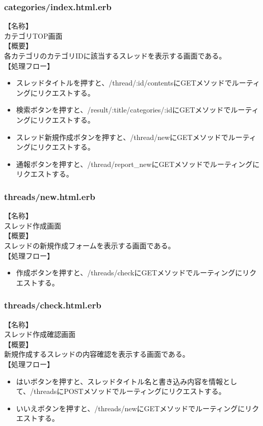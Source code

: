 \documentclass[a4j]{jarticle}
\begin{document}
\subsubsection{categories/index.html.erb}
\noindent
【名称】\\
カテゴリTOP画面\\
【概要】\\
各カテゴリのカテゴリIDに該当するスレッドを表示する画面である。\\
【処理フロー】
\begin{itemize}
  \item スレッドタイトルを押すと、/thread/:id/contentsにGETメソッドでルーティングにリクエストする。
  \item 検索ボタンを押すと、/result/:title/categories/:idにGETメソッドでルーティングにリクエストする。
  \item スレッド新規作成ボタンを押すと、/thread/newにGETメソッドでルーティングにリクエストする。
  \item 通報ボタンを押すと、/thread/report\_newにGETメソッドでルーティングにリクエストする。
\end{itemize}

\subsubsection{threads/new.html.erb}
\noindent
【名称】\\
スレッド作成画面\\
【概要】\\
スレッドの新規作成フォームを表示する画面である。\\
【処理フロー】
\begin{itemize}
  \item 作成ボタンを押すと、/threads/checkにGETメソッドでルーティングにリクエストする。
\end{itemize}

\subsubsection{threads/check.html.erb}
\noindent
【名称】\\
スレッド作成確認画面\\
【概要】\\
新規作成するスレッドの内容確認を表示する画面である。\\
【処理フロー】
\begin{itemize}
  \item はいボタンを押すと、スレッドタイトル名と書き込み内容を情報として、/threadsにPOSTメソッドでルーティングにリクエストする。
  \item いいえボタンを押すと、/threads/newにGETメソッドでルーティングにリクエストする。  
\end{itemize}
\end{document}
